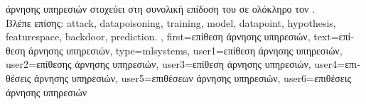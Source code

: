 {{		\foreignlanguage{greek}{άρνησης υπηρεσιών στοχεύει στη συνολική επίδοση του}  
		\foreignlanguage{greek}{σε ολόκληρο τον} .
		\\
		\foreignlanguage{greek}{Βλέπε επίσης:} \gls{attack}, \gls{datapoisoning}, \gls{training}, \gls{model}, \gls{datapoint}, \gls{hypothesis}, 
		\gls{featurespace}, \gls{backdoor}, \gls{prediction}. },
	first={\foreignlanguage{greek}{επίθεση άρνησης υπηρεσιών}},
	text={\foreignlanguage{greek}{επίθεση άρνησης υπηρεσιών}},
	type=mlsystems,
	user1={\foreignlanguage{greek}{επίθεση άρνησης υπηρεσιών}}, %
  	user2={\foreignlanguage{greek}{επίθεσης άρνησης υπηρεσιών}}, %
	user3={\foreignlanguage{greek}{επίθεση άρνησης υπηρεσιών}}, %
  	user4={\foreignlanguage{greek}{επιθέσεις άρνησης υπηρεσιών}}, %
	user5={\foreignlanguage{greek}{επιθέσεων άρνησης υπηρεσιών}}, %
  	user6={\foreignlanguage{greek}{επιθέσεις άρνησης υπηρεσιών}} %
}

